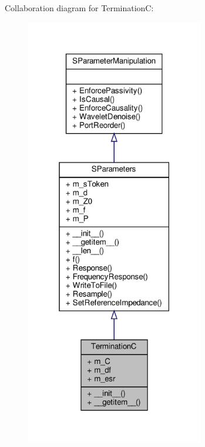 Collaboration diagram for TerminationC\+:\nopagebreak
\begin{figure}[H]
\begin{center}
\leavevmode
\includegraphics[width=220pt]{classSignalIntegrity_1_1SParameters_1_1Devices_1_1TerminationC_1_1TerminationC__coll__graph}
\end{center}
\end{figure}
